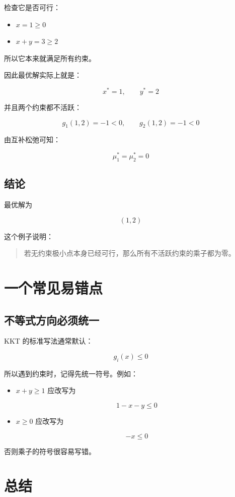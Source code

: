 检查它是否可行：

\begin{itemize}
  \item \(x=1\ge 0\)
  \item \(x+y=3\ge 2\)
\end{itemize}

所以它本来就满足所有约束。

因此最优解实际上就是：

\[
x^* = 1,\qquad y^* = 2
\]

并且两个约束都不活跃：

\[
g_1(1,2)=-1<0,\qquad g_2(1,2)=-1<0
\]

由互补松弛可知：

\[
\mu_1^*=\mu_2^*=0
\]

\subsection{结论}

最优解为

\[
(1,2)
\]

这个例子说明：

\begin{quote}
若无约束极小点本身已经可行，那么所有不活跃约束的乘子都为零。
\end{quote}

\section{一个常见易错点}

\subsection{不等式方向必须统一}

KKT 的标准写法通常默认：

\[
g_i(x)\le 0
\]

所以遇到约束时，记得先统一符号。例如：

\begin{itemize}
  \item \(x+y\ge 1\) 应改写为
  
  \[
  1-x-y\le 0
  \]
  \item \(x\ge 0\) 应改写为
  
  \[
  -x\le 0
  \]
\end{itemize}

否则乘子的符号很容易写错。

\section{总结}

